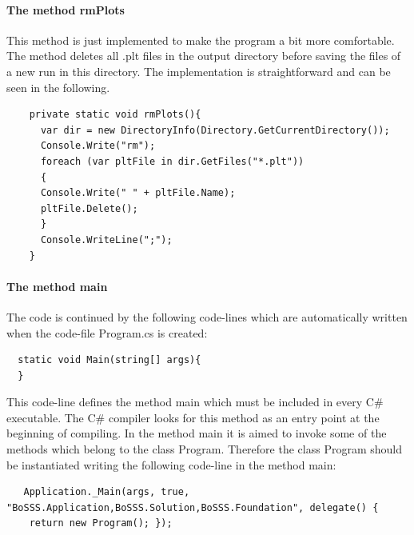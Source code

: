 \documentclass[11pt,twoside,a4paper]{fdyartcl}
\begin{document}
\paragraph{The method rmPlots}
This method is just implemented to make the program a bit more comfortable. The method deletes all .plt files in the output directory before saving the files of a new run in this directory. The implementation is straightforward and can be seen in the following.
\scriptsize \begin{verbatim}
	private static void rmPlots(){
	  var dir = new DirectoryInfo(Directory.GetCurrentDirectory());
	  Console.Write("rm");
	  foreach (var pltFile in dir.GetFiles("*.plt"))
	  {
	  Console.Write(" " + pltFile.Name);
	  pltFile.Delete();
	  }
	  Console.WriteLine(";");
	}
\end{verbatim}
\paragraph{The method {\scriptsize main}}
The code is continued by the following code-lines which are automatically written when the code-file {\scriptsize Program.cs} is created:
{\scriptsize \begin{verbatim}
  static void Main(string[] args){
  }
\end{verbatim}}
This code-line defines the method {\scriptsize main} which must be included in every C\# executable. The C\# compiler looks for this method as an entry point at the beginning of compiling. In the method {\scriptsize main} it is aimed to invoke some of the methods which belong to the class {\scriptsize Program}. Therefore the class {\scriptsize Program} should be instantiated writing the following code-line in the method {\scriptsize main}:
{\scriptsize \begin{verbatim}
   Application._Main(args, true, "BoSSS.Application,BoSSS.Solution,BoSSS.Foundation", delegate() {
   	return new Program(); });
\end{verbatim}}
\end{document}
